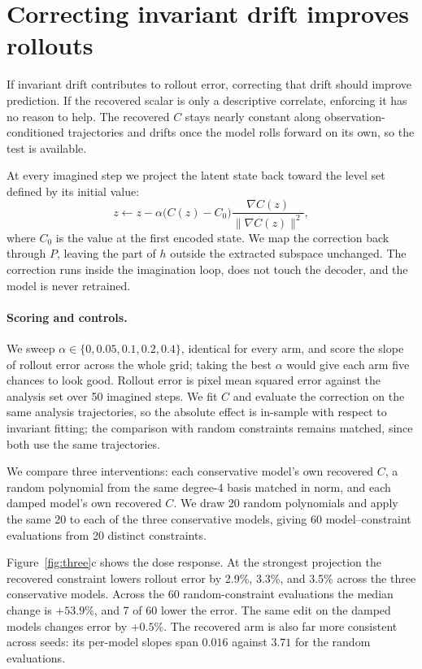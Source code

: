 \section{Correcting invariant drift improves rollouts}
\label{sec:intervention}

If invariant drift contributes to rollout error, correcting that drift should improve prediction. If
the recovered scalar is only a descriptive correlate, enforcing it has no reason to help. The
recovered $C$ stays nearly constant along observation-conditioned trajectories and drifts once the
model rolls forward on its own, so the test is available.

At every imagined step we project the latent state back toward the level set defined by its initial
value:
\begin{equation}
z \leftarrow z - \alpha\bigl(C(z)-C_0\bigr)\frac{\nabla C(z)}{\|\nabla C(z)\|^2},
\label{eq:edit}
\end{equation}
where $C_0$ is the value at the first encoded state. We map the correction back through $P$, leaving
the part of $h$ outside the extracted subspace unchanged. The correction runs inside the imagination
loop, does not touch the decoder, and the model is never retrained.

\paragraph{Scoring and controls.} We sweep $\alpha \in \{0, 0.05, 0.1, 0.2, 0.4\}$, identical for
every arm, and score the slope of rollout error across the whole grid; taking the best $\alpha$
would give each arm five chances to look good. Rollout error is pixel mean squared error against the
analysis set over 50 imagined steps. We fit $C$ and evaluate the correction on the same analysis
trajectories, so the absolute effect is in-sample with respect to invariant fitting; the comparison
with random constraints remains matched, since both use the same trajectories.

We compare three interventions: each conservative model's own recovered $C$, a random polynomial
from the same degree-4 basis matched in norm, and each damped model's own recovered $C$. We draw 20
random polynomials and apply the same 20 to each of the three conservative models, giving 60
model--constraint evaluations from 20 distinct constraints.

Figure~\ref{fig:three}c shows the dose response. At the strongest projection the recovered
constraint lowers rollout error by 2.9\%, 3.3\%, and 3.5\% across the three conservative models.
Across the 60 random-constraint evaluations the median change is $+53.9\%$, and 7 of 60 lower the
error. The same edit on the damped models changes error by $+0.5\%$. The recovered arm is also far
more consistent across seeds: its per-model slopes span $0.016$ against $3.71$ for the random
evaluations.

